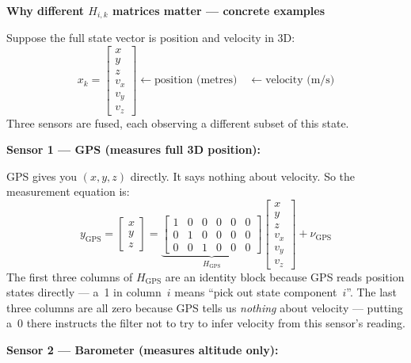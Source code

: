 \documentclass[12pt, a4paper]{article}
\begin{document}
\begin{notebox}
  \textbf{Why different $H_{i,k}$ matrices matter --- concrete examples}

  Suppose the full state vector is position and velocity in 3D:
  \[
    x_k =
    \begin{bmatrix} x \\ y \\ z \\ v_x \\ v_y \\ v_z \end{bmatrix}
    \leftarrow\text{position (metres)}
    \quad
    \leftarrow\text{velocity (m/s)}
  \]
  Three sensors are fused, each observing a different subset of this state.

  \bigskip
  \textbf{Sensor 1 --- GPS (measures full 3D position):}

  GPS gives you $(x, y, z)$ directly.
  It says nothing about velocity.
  So the measurement equation is:
  \[
    y_\text{GPS}
    = \begin{bmatrix} x \\ y \\ z \end{bmatrix}
    = \underbrace{\begin{bmatrix}
        1 & 0 & 0 & 0 & 0 & 0 \\
        0 & 1 & 0 & 0 & 0 & 0 \\
        0 & 0 & 1 & 0 & 0 & 0
      \end{bmatrix}}_{H_\text{GPS}}
    \begin{bmatrix} x \\ y \\ z \\ v_x \\ v_y \\ v_z \end{bmatrix}
    + \nu_\text{GPS}
  \]
  The first three columns of $H_\text{GPS}$ are an identity block because GPS
  reads position states directly --- a~1 in column~$i$ means ``pick out state
  component~$i$''.
  The last three columns are all zero because GPS tells us \emph{nothing}
  about velocity --- putting a~0 there instructs the filter not to try to
  infer velocity from this sensor's reading.

  \bigskip
  \textbf{Sensor 2 --- Barometer (measures altitude only):}


\end{notebox}
\end{document}
